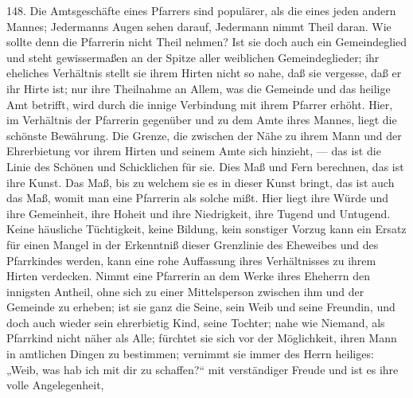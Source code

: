 148. Die Amtsgeschäfte eines Pfarrers sind populärer, als die eines jeden andern Mannes; Jedermanns Augen sehen darauf, Jedermann nimmt Theil daran. Wie sollte denn die Pfarrerin nicht Theil nehmen? Ist sie doch auch ein Gemeindeglied und steht gewissermaßen an
der Spitze aller weiblichen Gemeindeglieder; ihr eheliches Verhältnis stellt sie ihrem Hirten nicht so nahe, daß sie vergesse, daß er ihr Hirte ist; nur ihre Theilnahme an Allem, was die Gemeinde und das heilige Amt betrifft, wird durch die innige Verbindung mit ihrem Pfarrer erhöht. Hier, im Verhältnis der Pfarrerin gegenüber und zu dem Amte ihres Mannes, liegt die schönste Bewährung. Die Grenze, die zwischen der Nähe zu ihrem Mann und der Ehrerbietung vor ihrem Hirten und seinem Amte sich hinzieht, — das ist die Linie des Schönen und Schicklichen für sie. Dies Maß und Fern berechnen, das ist ihre Kunst. Das Maß, bis zu welchem sie es in dieser Kunst bringt, das ist auch das Maß, womit man eine Pfarrerin als solche mißt. Hier liegt ihre Würde und ihre Gemeinheit, ihre Hoheit und ihre Niedrigkeit, ihre Tugend und Untugend. Keine häusliche Tüchtigkeit, keine Bildung, kein sonstiger Vorzug kann ein Ersatz für einen Mangel in der Erkenntniß dieser Grenzlinie des Eheweibes und des Pfarrkindes werden, kann eine rohe Auffassung ihres Verhältnisses zu ihrem Hirten verdecken. Nimmt eine Pfarrerin an dem Werke ihres Eheherrn den innigsten Antheil, ohne sich zu einer Mittelsperson zwischen ihm und der Gemeinde zu erheben; ist sie ganz die Seine, sein Weib und seine Freundin, und doch auch wieder sein ehrerbietig Kind, seine Tochter; nahe wie Niemand, als Pfarrkind nicht näher als Alle; fürchtet sie sich vor der Möglichkeit, ihren Mann in amtlichen Dingen zu bestimmen; vernimmt sie immer des Herrn heiliges: „Weib, was hab ich mit dir zu schaffen?“ mit verständiger Freude und ist es ihre volle Angelegenheit,
